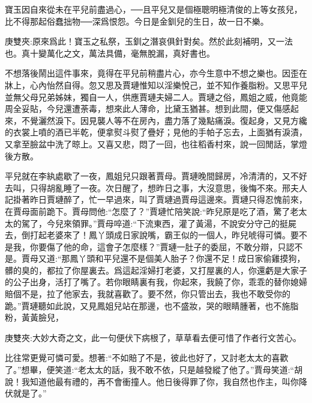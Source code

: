 \begin{parag}
    寶玉因自來從未在平兒前盡過心，──且平兒又是個極聰明極清俊的上等女孩兒，比不得那起俗蠢拙物──深爲恨怨。今日是金釧兒的生日，故一日不樂。\begin{note}庚雙夾:原來爲此！寶玉之私祭，玉釧之潛哀俱針對矣。然於此刻補明，又一法也。真十變萬化之文，萬法具備，毫無脫漏，真好書也。\end{note}不想落後鬧出這件事來，竟得在平兒前稍盡片心，亦今生意中不想之樂也。因歪在牀上，心內怡然自得。忽又思及賈璉惟知以淫樂悅己，並不知作養脂粉。又思平兒並無父母兄弟姊妹，獨自一人，供應賈璉夫婦二人。賈璉之俗，鳳姐之威，他竟能周全妥貼，今兒還遭荼毒，想來此人薄命，比黛玉猶甚。想到此間，便又傷感起來，不覺灑然淚下。因見襲人等不在房內，盡力落了幾點痛淚。復起身，又見方纔的衣裳上噴的酒已半乾，便拿熨斗熨了疊好；見他的手帕子忘去，上面猶有淚漬，又拿至臉盆中洗了晾上。又喜又悲，悶了一回，也往稻香村來，說一回閒話，掌燈後方散。
\end{parag}


\begin{parag}
    平兒就在李紈處歇了一夜，鳳姐兒只跟著賈母。賈璉晚間歸房，冷清清的，又不好去叫，只得胡亂睡了一夜。次日醒了，想昨日之事，大沒意思，後悔不來。邢夫人記掛著昨日賈璉醉了，忙一早過來，叫了賈璉過賈母這邊來。賈璉只得忍愧前來，在賈母面前跪下。賈母問他:“怎麼了？”賈璉忙陪笑說:“昨兒原是吃了酒，驚了老太太的駕了，今兒來領罪。”賈母啐道:“下流東西，灌了黃湯，不說安分守己的挺屍去，倒打起老婆來了！鳳丫頭成日家說嘴，霸王似的一個人，昨兒唬得可憐。要不是我，你要傷了他的命，這會子怎麼樣？”賈璉一肚子的委屈，不敢分辯，只認不是。賈母又道:“那鳳丫頭和平兒還不是個美人胎子？你還不足！成日家偷雞摸狗，髒的臭的，都拉了你屋裏去。爲這起淫婦打老婆，又打屋裏的人，你還虧是大家子的公子出身，活打了嘴了。若你眼睛裏有我，你起來，我饒了你，乖乖的替你媳婦賠個不是，拉了他家去，我就喜歡了。要不然，你只管出去，我也不敢受你的跪。”賈璉聽如此說，又見鳳姐兒站在那邊，也不盛妝，哭的眼睛腫著，也不施脂粉，黃黃臉兒，\begin{note}庚雙夾:大妙大奇之文，此一句便伏下病根了，草草看去便可惜了作者行文苦心。\end{note}比往常更覺可憐可愛。想著:“不如賠了不是，彼此也好了，又討老太太的喜歡了。”想畢，便笑道:“老太太的話，我不敢不依，只是越發縱了他了。”賈母笑道:“胡說！我知道他最有禮的，再不會衝撞人。他日後得罪了你，我自然也作主，叫你降伏就是了。”
\end{parag}


